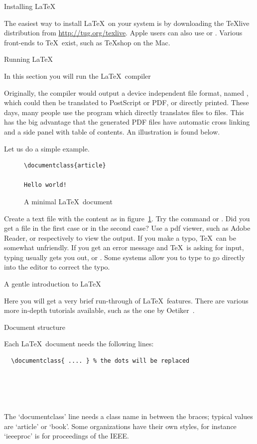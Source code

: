 {Installing \LaTeX}

The easiest way to install \LaTeX\ on your system is by downloading
the \TeX{}live distribution from \url{http://tug.org/texlive}. Apple
users can also use  or . Various front-ends to
\TeX\ exist, such as \TeX{}shop on the Mac.

 {Running \LaTeX}

\begin{purpose}
In this section you will run the \LaTeX\ compiler  
\end{purpose}

Originally, the  compiler would output a device independent
file format, named , which could then be translated to
PostScript or PDF, or directly printed. These days, many people use
the  program which directly translates  files to
 files. This has the big advantage that the generated PDF
files have automatic cross linking and a side panel with table of
contents. An illustration is found below.

Let us do a simple example.
\begin{figure}[ht]
\begin{verbatim}
\documentclass{article}

Hello world!

\end{verbatim}
  \caption{A minimal \LaTeX\ document}
  \label{fig:minimaldoc}
\end{figure}
\practical
{Create a text file  with the content as in
  figure~\ref{fig:minimaldoc}. Try the command  or
  . Did you get a file  in the first
  case or  in the second case? Use a pdf viewer, such
  as Adobe Reader, or
   respectively to view the output.}  
{}
{If you make a typo, \TeX\ can be somewhat unfriendly. If you get an
  error message and \TeX\ is asking for input, typing 
  usually gets you out, or . Some systems allow you to type
   to go directly into the editor to correct the typo.}

 {A gentle introduction to LaTeX}

Here you will get a very brief run-through of \LaTeX\ features. There
are various more in-depth tutorials available, such as the one by
Oetiker~\cite{Oetiker:LaTeXintro}.

 {Document structure}

Each \LaTeX\ document needs the following lines:
\begin{verbatim}
  \documentclass{ .... } % the dots will be replaced

  

    
\end{verbatim}
The `documentclass' line needs a class name in between the braces;
typical values are `article' or `book'. Some organizations have their
own styles, for instance `ieeeproc' is for proceedings of the IEEE.

